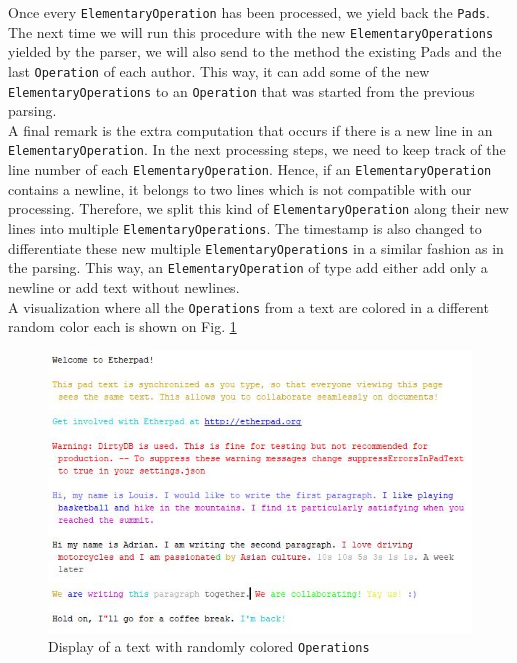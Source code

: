 \documentclass[a4, twocolumn, 12pt]{article}
\begin{document}
Once every \texttt{ElementaryOperation} has been processed, we yield back the \texttt{Pads}.\\
The next time we will run this procedure with the new \texttt{ElementaryOperations} yielded by the parser, we will also send to the method the existing Pads and the last \texttt{Operation} of each author. This way, it can add some of the new \texttt{ElementaryOperations} to an \texttt{Operation} that was started from the previous parsing.\\
A final remark is the extra computation that occurs if there is a new line in an \texttt{ElementaryOperation}. In the next processing steps, we need to keep track of the line number of each \texttt{ElementaryOperation}. Hence, if an \texttt{ElementaryOperation} contains a newline, it belongs to two lines which is not compatible with our processing. Therefore, we split this kind of \texttt{ElementaryOperation} along their new lines into multiple \texttt{ElementaryOperations}. The timestamp is also changed to differentiate these new multiple \texttt{ElementaryOperations} in a similar fashion as in the parsing. This way, an \texttt{ElementaryOperation} of type add either add only a newline or add text without newlines.\\
A visualization where all the \texttt{Operations} from a text are colored in a different random color each is shown on Fig. \ref{operations}
\begin{figure}
\centering
\includegraphics[scale=0.5]{figures/operations.JPG}
\caption{Display of a text with randomly colored \texttt{Operations}}
\label{operations}
\end{figure}
\end{document}
